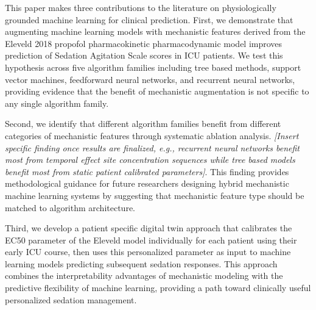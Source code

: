 \documentclass[11pt,a4paper]{article}
\newcommand{\placeholder}[1]{\textcolor{placeholdergray}{\textit{[#1]}}}
\begin{document}
This paper makes three contributions to the literature on physiologically
grounded machine learning for clinical prediction. First, we demonstrate
that augmenting machine learning models with mechanistic features
derived from the Eleveld 2018 propofol pharmacokinetic pharmacodynamic
model improves prediction of Sedation Agitation Scale scores in ICU
patients. We test this hypothesis across five algorithm families
including tree based methods, support vector machines, feedforward
neural networks, and recurrent neural networks, providing evidence
that the benefit of mechanistic augmentation is not specific to any
single algorithm family.

Second, we identify that different algorithm families benefit from
different categories of mechanistic features through systematic
ablation analysis. \placeholder{Insert specific finding once results
are finalized, e.g., recurrent neural networks benefit most from
temporal effect site concentration sequences while tree based models
benefit most from static patient calibrated parameters}. This finding
provides methodological guidance for future researchers designing
hybrid mechanistic machine learning systems by suggesting that
mechanistic feature type should be matched to algorithm architecture.

Third, we develop a patient specific digital twin approach that
calibrates the EC50 parameter of the Eleveld model individually for
each patient using their early ICU course, then uses this personalized
parameter as input to machine learning models predicting subsequent
sedation responses. This approach combines the interpretability
advantages of mechanistic modeling with the predictive flexibility
of machine learning, providing a path toward clinically useful
personalized sedation management.

%
\end{document}

